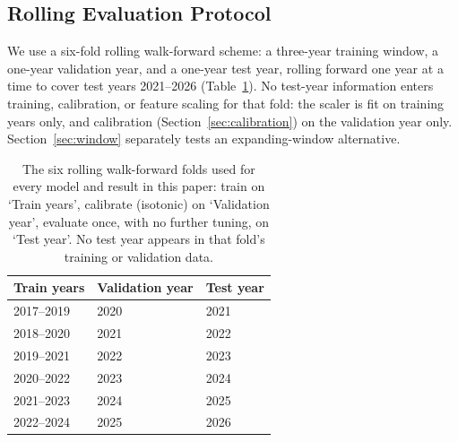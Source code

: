 \documentclass[sigconf,review,anonymous]{acmart}
\begin{document}
\subsection{Rolling Evaluation Protocol}
We use a six-fold rolling walk-forward scheme: a three-year training window, a one-year validation year, and a one-year test year, rolling forward one year at a time to cover test years 2021--2026 (Table~\ref{tab:folds}). No test-year information enters training, calibration, or feature scaling for that fold: the scaler is fit on training years only, and calibration (Section~\ref{sec:calibration}) on the validation year only. Section~\ref{sec:window} separately tests an expanding-window alternative.

\begin{table}[H]
\centering
\footnotesize
\begin{tabular}{lll}
\toprule
Train years & Validation year & Test year \\
\midrule
2017--2019 & 2020 & 2021 \\
2018--2020 & 2021 & 2022 \\
2019--2021 & 2022 & 2023 \\
2020--2022 & 2023 & 2024 \\
2021--2023 & 2024 & 2025 \\
2022--2024 & 2025 & 2026 \\
\bottomrule
\end{tabular}
\caption{The six rolling walk-forward folds used for every model and result in this paper: train on `Train years', calibrate (isotonic) on `Validation year', evaluate once, with no further tuning, on `Test year'. No test year appears in that fold's training or validation data.}
\label{tab:folds}
\end{table}
\end{document}
